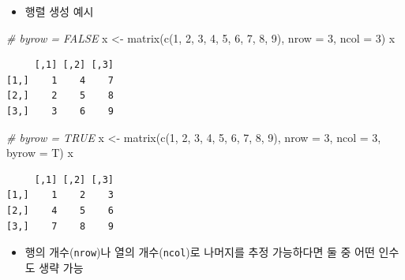 \documentclass[
  11pt,
]{krantz}
\newenvironment{Shaded}{\begin{snugshade}}{\end{snugshade}}
\newcommand{\AttributeTok}[1]{\textcolor[rgb]{0.61,0.61,0.61}{#1}}
\newcommand{\CommentTok}[1]{\textcolor[rgb]{0.37,0.37,0.37}{\textit{#1}}}
\newcommand{\DecValTok}[1]{\textcolor[rgb]{0.06,0.06,0.06}{#1}}
\newcommand{\FunctionTok}[1]{\textcolor[rgb]{0,0,0}{#1}}
\newcommand{\NormalTok}[1]{#1}
\newcommand{\OtherTok}[1]{\textcolor[rgb]{0.37,0.37,0.37}{#1}}
\providecommand{\tightlist}{%
  \setlength{\itemsep}{0pt}\setlength{\parskip}{0pt}}
\begin{document}
\normalsize

\begin{itemize}
\tightlist
\item
  행렬 생성 예시
\end{itemize}

\footnotesize

\begin{Shaded}
\begin{Highlighting}[]
\CommentTok{\# byrow = FALSE}
\NormalTok{x }\OtherTok{\textless{}{-}} \FunctionTok{matrix}\NormalTok{(}\FunctionTok{c}\NormalTok{(}\DecValTok{1}\NormalTok{, }\DecValTok{2}\NormalTok{, }\DecValTok{3}\NormalTok{, }\DecValTok{4}\NormalTok{, }\DecValTok{5}\NormalTok{, }\DecValTok{6}\NormalTok{, }\DecValTok{7}\NormalTok{, }\DecValTok{8}\NormalTok{, }\DecValTok{9}\NormalTok{), }\AttributeTok{nrow =} \DecValTok{3}\NormalTok{, }\AttributeTok{ncol =} \DecValTok{3}\NormalTok{)}
\NormalTok{x}
\end{Highlighting}
\end{Shaded}

\begin{verbatim}
     [,1] [,2] [,3]
[1,]    1    4    7
[2,]    2    5    8
[3,]    3    6    9
\end{verbatim}

\begin{Shaded}
\begin{Highlighting}[]
\CommentTok{\# byrow = TRUE}
\NormalTok{x }\OtherTok{\textless{}{-}} \FunctionTok{matrix}\NormalTok{(}\FunctionTok{c}\NormalTok{(}\DecValTok{1}\NormalTok{, }\DecValTok{2}\NormalTok{, }\DecValTok{3}\NormalTok{, }\DecValTok{4}\NormalTok{, }\DecValTok{5}\NormalTok{, }\DecValTok{6}\NormalTok{, }\DecValTok{7}\NormalTok{, }\DecValTok{8}\NormalTok{, }\DecValTok{9}\NormalTok{), }\AttributeTok{nrow =} \DecValTok{3}\NormalTok{, }\AttributeTok{ncol =} \DecValTok{3}\NormalTok{, }\AttributeTok{byrow =}\NormalTok{ T)}
\NormalTok{x}
\end{Highlighting}
\end{Shaded}

\begin{verbatim}
     [,1] [,2] [,3]
[1,]    1    2    3
[2,]    4    5    6
[3,]    7    8    9
\end{verbatim}

\normalsize

\begin{itemize}
\tightlist
\item
  행의 개수(\texttt{nrow})나 열의 개수(\texttt{ncol})로 나머지를 추정 가능하다면 둘 중 어떤 인수도 생략 가능
\end{itemize}
\end{document}
